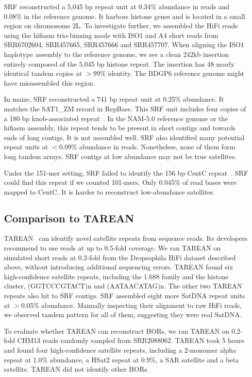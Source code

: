 \documentclass{bioinfo}
\begin{document}
SRF reconstructed a 5,045 bp repeat unit at 0.34\% abundance in reads and
0.08\% in the reference genome. It harbors histone genes and is located in a
small region on chromosome 2L. To investigate further, we assembled the HiFi
reads using the hifiasm trio-binning mode with ISO1 and A4 short reads from
SRR6702604, SRR457665, SRR457666 and SRR457707. When aligning the ISO1
haplotype assembly to the reference genome, we see a clean 242kb insertion
entirely composed of the 5,045 bp histone repeat. The insertion has 48 nearly
identical tandem copies at $>$99\% identity. The BDGP6 reference genome might
have misassembled this region.

In maize, SRF reconstructed a 741 bp repeat unit at 0.25\% abundance. It matches
the SAT1\_ZM record in RepBase. This SRF unit includes four copies of a 180 bp
knob-associated repeat~\citep{Ananiev:1998ab}. In the NAM-5.0 reference genome
or the hifiasm assembly, this repeat tends to be present in short contigs and
towards ends of long contigs. It is not assembled well. SRF also identified
many potential repeat units at $<$0.09\% abundance in reads. Nonetheless, none
of them form long tandem arrays. SRF contigs at low abundance may not be true
satellites.

Under the 151-mer setting, SRF failed to identify the 156 bp CentC
repeat~\citep{Ananiev:1998aa}. SRF could find this repeat if we counted
101-mers. Only 0.045\% of read bases were mapped to CentC. It is harder to
reconstruct low-abundance satellites.

\subsection{Comparison to TAREAN}

TAREAN~\citep{Novak:2017wx} can identify novel satellite repeats from sequence
reads. Its developers recommend to use reads at up to 0.5-fold coverage. We
ran TAREAN on simulated short reads at 0.2-fold from the Dropsophila HiFi
dataset described above, without introducing additional sequencing errors.
TAREAN found six high-confidence satellite repeats, including the 1.688 family
and the histone cluster, (GGTCCCGTACT)n and (AATAACATAG)n. The other two TAREAN
repeats also hit to SRF contigs. SRF assembled eight more SatDNA repeat units
at $>$0.05\% abundance. Manually inspecting their alignment to raw HiFi reads,
we observed tandem pattern for all of them, suggesting they were real SatDNA.

To evaluate whether TAREAN can reconstruct HORs, we ran TAREAN on 0.2-fold
CHM13 reads randomly sampled from SRR2088062. TAREAN took 5 hours and found
four high-confidence satellite repeats, including a 2-monomer alpha repeat at
1.0\% abundance, a HSat2 repeat at 0.9\%, a SAR satellite and a beta satellite.
TAREAN did not identify other HORs.
\end{document}

